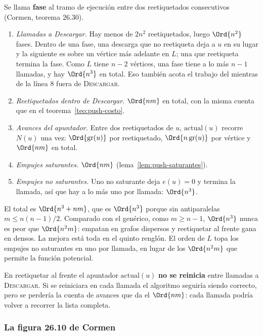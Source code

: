 \documentclass[11pt,letterpaper]{article}
\begin{document}
Se llama \textbf{fase} al tramo de ejecución entre dos reetiquetados
consecutivos (Cormen, teorema 26.30).
\begin{enumerate}
  \item \emph{Llamadas a Descargar.} Hay menos de $2n^2$
        reetiquetados, luego $\Ord{n^2}$ fases. Dentro de una fase, una
        descarga que no reetiqueta deja a $u$ en su lugar y la
        siguiente es sobre un vértice más adelante en $L$; una que
        reetiqueta termina la fase. Como $L$ tiene $n - 2$ vértices,
        una fase tiene a lo más $n - 1$ llamadas, y hay $\Ord{n^3}$ en
        total. Eso también acota el trabajo del mientras de la línea 8
        fuera de \textsc{Descargar}.
  \item \emph{Reetiquetados dentro de Descargar.} $\Ord{nm}$ en total,
        con la misma cuenta que en el teorema~\ref{teo:push-costo}.
  \item \emph{Avances del apuntador.} Entre dos reetiquetados de $u$,
        $\text{actual}(u)$ recorre $N(u)$ una vez:
        $\Ord{\text{gr}(u)}$ por reetiquetado, $\Ord{n\,\text{gr}(u)}$
        por vértice y $\Ord{nm}$ en total.
  \item \emph{Empujes saturantes.} $\Ord{nm}$
        (lema~\ref{lem:push-saturantes}).
  \item \emph{Empujes no saturantes.} Uno no saturante deja
        $e(u) = 0$ y termina la llamada, así que hay a lo más uno por
        llamada: $\Ord{n^3}$.
\end{enumerate}
El total es $\Ord{n^3 + nm}$, que es $\Ord{n^3}$ porque sin
antiparalelas $m \le n(n - 1)/2$. Comparado con el genérico, como
$m \ge n - 1$, $\Ord{n^3}$ nunca es peor que $\Ord{n^2 m}$: empatan en
grafos dispersos y reetiquetar al frente gana en densos. La mejora está
toda en el quinto renglón. El orden de $L$ topa los empujes no
saturantes en uno por llamada, en lugar de los $\Ord{n^2 m}$ que
permite la función potencial.

\begin{ojo}
  En reetiquetar al frente el apuntador $\text{actual}(u)$
  \textbf{no se reinicia} entre llamadas a \textsc{Descargar}. Si se
  reiniciara en cada llamada el algoritmo seguiría siendo correcto,
  pero se perdería la cuenta de avances que da el $\Ord{nm}$: cada
  llamada podría volver a recorrer la lista completa.
\end{ojo}

\subsubsection*{La figura 26.10 de Cormen}
\end{document}
